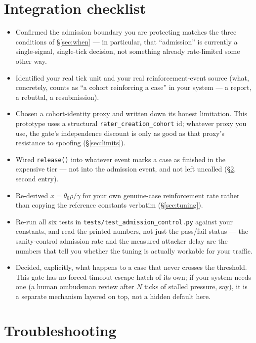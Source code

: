 \documentclass[11pt]{article}
\begin{document}
\section{Integration checklist}
\label{sec:checklist}

\begin{itemize}
\item[$\square$] Confirmed the admission boundary you are protecting
  matches the three conditions of \S\ref{sec:when} --- in particular,
  that ``admission'' is currently a single-signal, single-tick decision,
  not something already rate-limited some other way.
\item[$\square$] Identified your real tick unit and your real
  reinforcement-event source (what, concretely, counts as ``a cohort
  reinforcing a case'' in your system --- a report, a rebuttal, a
  resubmission).
\item[$\square$] Chosen a cohort-identity proxy and written down its
  honest limitation. This prototype uses a structural
  \texttt{rater\_creation\_cohort} id; whatever proxy you use, the gate's
  independence discount is only as good as that proxy's resistance to
  spoofing (\S\ref{sec:limits}).
\item[$\square$] Wired \texttt{release()} into whatever event marks a
  case as finished in the expensive tier --- not into the admission
  event, and not left uncalled (\S\ref{sec:pitfalls}, second entry).
\item[$\square$] Re-derived $x=\theta_0\rho/\gamma$ for your own
  genuine-case reinforcement rate rather than copying the reference
  constants verbatim (\S\ref{sec:tuning}).
\item[$\square$] Re-run all six tests in
  \texttt{tests/test\_admission\_control.py} against your constants, and
  read the printed numbers, not just the pass/fail status --- the
  sanity-control admission rate and the measured attacker delay are the
  numbers that tell you whether the tuning is actually workable for your
  traffic.
\item[$\square$] Decided, explicitly, what happens to a case that never
  crosses the threshold. This gate has no forced-timeout escape hatch of
  its own; if your system needs one (a human ombudsman review after $N$
  ticks of stalled pressure, say), it is a separate mechanism layered on
  top, not a hidden default here.
\end{itemize}

\section{Troubleshooting}
\label{sec:pitfalls}
\end{document}
